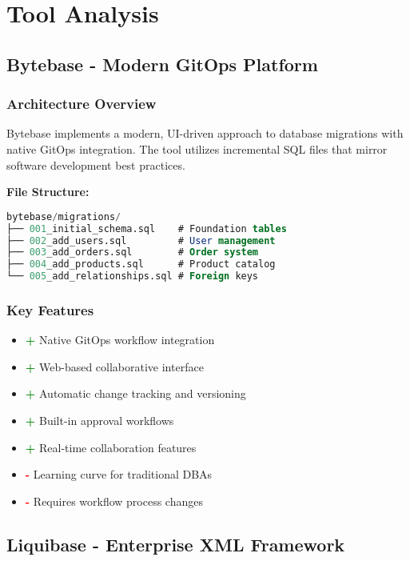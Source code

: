 \section{Tool Analysis}

\subsection{Bytebase - Modern GitOps Platform}

\subsubsection{Architecture Overview}
Bytebase implements a modern, UI-driven approach to database migrations with native GitOps integration. The tool utilizes incremental SQL files that mirror software development best practices.

\textbf{File Structure:}
\begin{lstlisting}[language=SQL, caption=Bytebase Migration Structure]
bytebase/migrations/
├── 001_initial_schema.sql    # Foundation tables
├── 002_add_users.sql         # User management
├── 003_add_orders.sql        # Order system
├── 004_add_products.sql      # Product catalog
└── 005_add_relationships.sql # Foreign keys
\end{lstlisting}

\subsubsection{Key Features}
\begin{itemize}
    \item \textcolor{green}{\textbf{+}} Native GitOps workflow integration
    \item \textcolor{green}{\textbf{+}} Web-based collaborative interface
    \item \textcolor{green}{\textbf{+}} Automatic change tracking and versioning
    \item \textcolor{green}{\textbf{+}} Built-in approval workflows
    \item \textcolor{green}{\textbf{+}} Real-time collaboration features
    \item \textcolor{red}{\textbf{-}} Learning curve for traditional DBAs
    \item \textcolor{red}{\textbf{-}} Requires workflow process changes
\end{itemize}

\subsection{Liquibase - Enterprise XML Framework}

